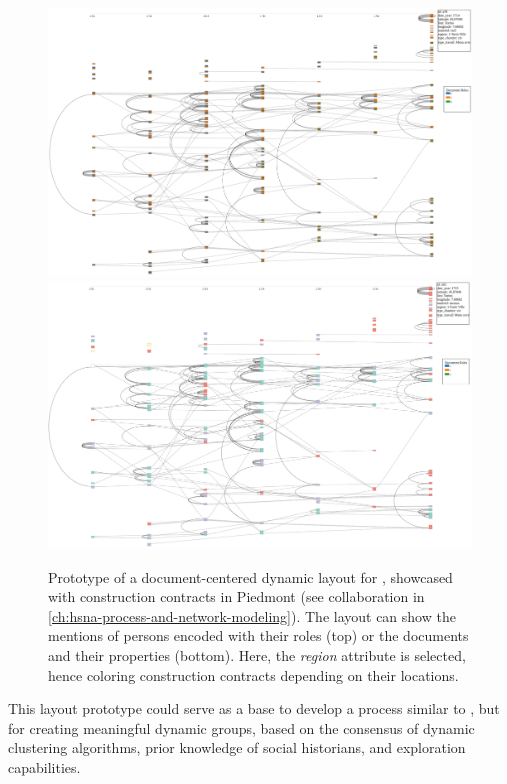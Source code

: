 \begin{figure}
    \centering
    \includegraphics[width=\textwidth]{static/figures/conclusion/dyn2}
    \includegraphics[width=\textwidth]{static/figures/conclusion/dyn2_region}
    \caption{Prototype of a document-centered dynamic layout for \modelplural, showcased with construction contracts in Piedmont (see collaboration \pascal in \autoref{ch:hsna-process-and-network-modeling}). The layout can show the mentions of persons encoded with their roles (top) or the documents and their properties (bottom). Here, the \emph{region} attribute is selected, hence coloring construction contracts depending on their locations.}
\label{fig:conclu-dynLayout}
\end{figure}

This layout prototype could serve as a base to develop a process similar to \pkclustering, but for creating meaningful dynamic groups, based on the consensus of dynamic clustering algorithms, prior knowledge of social historians, and exploration capabilities.



